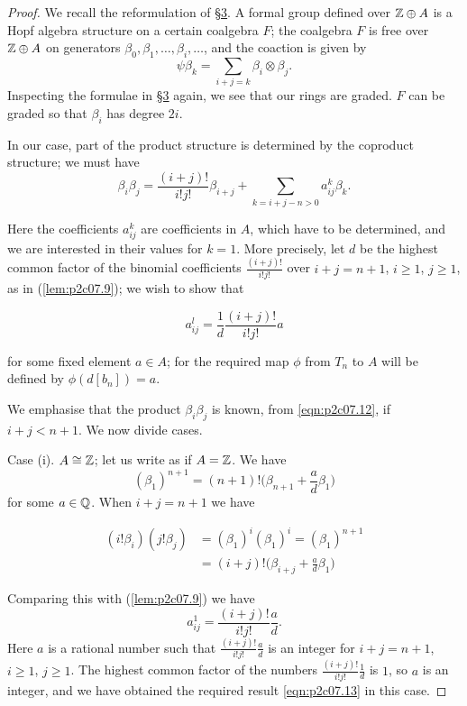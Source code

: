 \documentclass[../main]{subfiles}
\begin{document}
\begin{proof}
We recall the reformulation of \hyperref[sec:p2c3]{\S 3}. A formal group defined over $\mathbb{Z} \oplus A$ is a Hopf algebra structure on a certain coalgebra $F$; the coalgebra $F$ is free over $\mathbb{Z} \oplus A$ on generators $\beta_0, \beta_1, \ldots, \beta_i, \ldots$, and the coaction is given by \[\psi \beta_k = \sum_{i + j = k} \beta_i \otimes \beta_j.\] Inspecting the formulae in \hyperref[sec:p2c3]{\S 3} again, we see that our rings are graded. $F$ can be graded so that $\beta_i$ has degree $2i$. 

In our case, part of the product structure is determined by the coproduct structure; we must have
\begin{equation}
\tag{7.12}
\label{eqn:p2c07.12}
\beta_i \beta_j = \frac {(i + j)!} {i! j!} \beta_{i + j} + \sum_{k = i + j - n > 0} a_{ij}^k \beta_k.
\end{equation}

Here the coefficients $a_{ij}^k$ are coefficients in $A$, which have to be determined, and we are interested in their values for $k = 1$. More precisely, let $d$ be the highest common factor of the binomial coefficients $\tfrac {(i + j)!} {i! j!}$ over $i + j = n + 1$, $i \ge 1$, $j \ge 1$, as in (\ref{lem:p2c07.9}); we wish to show that 

\begin{equation}
\tag{7.13}
\label{eqn:p2c07.13}
a_{ij}^l = \frac 1 d \frac {(i + j)!} {i! j!} a
\end{equation}

for some fixed element $a \in A$; for the required map $\phi$ from $T_n$ to $A$ will be defined by $\phi(d[b_n]) = a$. 

We emphasise that the product $\beta_i \beta_j$ is known, from \eqref{eqn:p2c07.12}, if $i + j < n + 1$. We now divide cases.

Case (i). $A \cong \mathbb{Z}$; let us write as if $A = \mathbb{Z}$. We have \[(\beta_1)^{n + 1} = (n + 1)! \bigg(\beta_{n + 1} + \frac a d \beta_1\bigg)\] for some $a \in \mathbb{Q}$. When $i + j = n + 1$ we have 

\begin{align*}
(i! \beta_i) (j! \beta_j) & = (\beta_1)^i (\beta_1)^i = (\beta_1)^{n + 1} \\ & = (i + j)! \bigg(\beta_{i + j} + \frac a d \beta_1\bigg)
\end{align*}

Comparing this with (\ref{lem:p2c07.9}) we have \[a_{ij}^1 = \frac {(i + j)!} {i! j!} \frac a d.\] Here $a$ is a rational number such that $\displaystyle \frac {(i + j)!} {i! j!} \frac a d$ is an integer for $i + j = n + 1$, $i \ge 1$, $j \ge 1$. The highest common factor of the numbers $\displaystyle \frac {(i + j)!} {i! j!} \frac 1 d$ is $1$, so $a$ is an integer, and we have obtained the required result \eqref{eqn:p2c07.13} in this case.


\end{proof}
\end{document}
